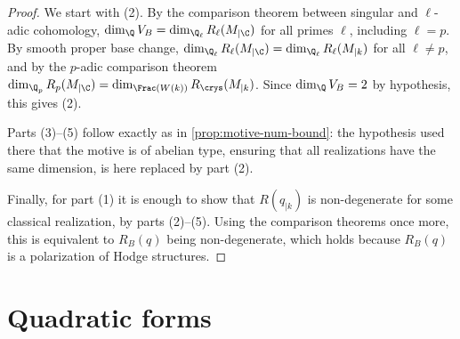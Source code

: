 \begin{proof}
  We start with (2). By the comparison theorem between singular and
  \(\ell\)-adic cohomology, \(\dim_\Q V_B = \dim_{\Q_\ell} R_\ell(M_{\vert\C})\)
  for all primes \(\ell\), including \(\ell = p\). By smooth proper base change,
  \(\dim_{\Q_\ell} R_\ell(M_{\vert\C}) = \dim_{\Q_\ell} R_\ell(M_{\vert{k}})\)
  for all \(\ell \neq p\), and by the \(p\)-adic comparison theorem
  \(\dim_{\Q_p} R_p(M_{\vert\C}) = \dim_{\Frac(W(k))} R_\crys(M_{\vert{k}})\).
  Since \(\dim_\Q V_B = 2\) by hypothesis, this gives (2).

  Parts (3)--(5) follow exactly as in \cref{prop:motive-num-bound}: the
  hypothesis used there that the motive is of abelian type, ensuring that all
  realizations have the same dimension, is here replaced by part (2).

  Finally, for part (1) it is enough to show that \(R(q_{\vert{k}})\) is
  non-degenerate for some classical realization, by parts (2)--(5). Using the
  comparison theorems once more, this is equivalent to \(R_B(q)\) being
  non-degenerate, which holds because \(R_B(q)\) is a polarization of Hodge
  structures.
\end{proof}

\section{Quadratic forms}

